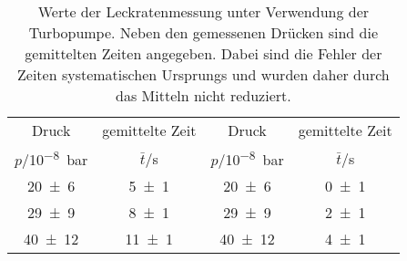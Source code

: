 \begin{table}[!h]
	\centering
	\begin{tabular}{cccc}
		\toprule
		Druck & gemittelte Zeit & Druck & gemittelte Zeit\\
		$p$/\si{10^{-8}bar} & $\bar{t}$/\si{s} & $p$/\si{10^{-8}bar} & $\bar{t}$/\si{s}\\
\midrule
		\num{20(6)} & \num{5(1)} & \num{20(6)} & \num{0(1)}\\
		\num{29(9)} & \num{8(1)} & \num{29(9)} & \num{2(1)}\\
		\num{40(12)} & \num{11(1)} & \num{40(12)} & \num{4(1)}\\
		\bottomrule
	\end{tabular}
	\caption{Werte der Leckratenmessung unter Verwendung der Turbopumpe.
                        Neben den gemessenen Drücken sind die gemittelten Zeiten angegeben. 
                        Dabei sind die Fehler der Zeiten systematischen Ursprungs und wurden 
                        daher durch das Mitteln nicht reduziert. \label{tab:Leckratenmessung_Turbo_0}}
\end{table}
